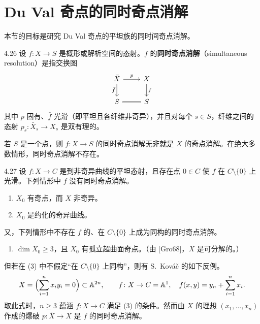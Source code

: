 \section{Du Val 奇点的同时奇点消解}

本节的目标是研究 Du Val 奇点的平坦族的同时间奇点消解。

\begin{definition}{4.26}
设 $f\colon X\to S$ 是概形或解析空间的态射。$f$ 的\textbf{同时奇点消解}（simultaneous resolution）是指交换图
\[
\begin{tikzcd}
\bar X \arrow[r,"p"] \arrow[d,"\bar f"'] & X \arrow[d,"f"] \\
S \arrow[r,equal] & S
\end{tikzcd}
\]
其中 $p$ 固有、$\bar f$ 光滑（即平坦且各纤维非奇异），并且对每个 $s\in S$，纤维之间的态射 $p_s\colon\bar X_s\to X_s$ 是双有理的。
\end{definition}

若 $S$ 是一个点，则 $f\colon X\to S$ 的同时奇点消解无非就是 $X$ 的奇点消解。在绝大多数情形，同时奇点消解不存在。


\begin{example}{4.27}
设 $f\colon X\to C$ 是到非奇异曲线的平坦态射，且存在点 $0\in C$ 使 $f$ 在 $C\setminus\{0\}$ 上光滑。下列情形中 $f$ 没有同时奇点消解。
\begin{enumerate}[label=(\arabic*),leftmargin=*]
\item $X_0$ 有奇点，而 $X$ 非奇异。
\item $X_0$ 是约化的奇异曲线。
\end{enumerate}
又，下列情形中不存在 $f$ 的、在 $C\setminus\{0\}$ 上成为同构的同时奇点消解。
\begin{enumerate}[label=(\arabic*),leftmargin=*,start=3]
\item $\dim X_0\ge 3$，且 $X_0$ 有孤立超曲面奇点。（由 [Gro68]，$X$ 是可分解的。）
\end{enumerate}
但若在 (3) 中不假定“在 $C\setminus\{0\}$ 上同构”，则有 S.~Kov\'a\v{c} 的如下反例。
\[
X=\Bigl(\sum_{i=1}^n x_iy_i=0\Bigr)\subset\mathbb{A}^{2n},
\qquad
f\colon X\to C=\mathbb{A}^1,\quad f(x,y)=y_n+\sum_{i=1}^n x_i .
\]
取此式时，$n\ge 3$ 蕴涵 $f\colon X\to C$ 满足 (3) 的条件。然而由 $X$ 的理想 $(x_1,\dots,x_n)$ 作成的爆破 $p\colon\bar X\to X$ 是 $f$ 的同时奇点消解。
\end{example}


